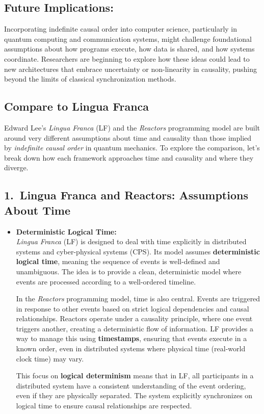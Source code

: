 \documentclass[../../../OAE-SPEC-MAIN.tex]{subfiles}
\begin{document}
\subsection*{Future Implications:}

Incorporating indefinite causal order into computer science, particularly in quantum computing and communication systems, might challenge foundational assumptions about how programs execute, how data is shared, and how systems coordinate. Researchers are beginning to explore how these ideas could lead to new architectures that embrace uncertainty or non-linearity in causality, pushing beyond the limits of classical synchronization methods.

\subsection{Compare to Lingua Franca}

Edward Lee’s \emph{Lingua Franca} (LF) and the \emph{Reactors} programming model are built around very different assumptions about time and causality than those implied by \emph{indefinite causal order} in quantum mechanics. To explore the comparison, let’s break down how each framework approaches time and causality and where they diverge.

\subsection*{1.\ Lingua Franca and Reactors: Assumptions About Time}

\begin{itemize}[leftmargin=1.5em]
\item \textbf{Deterministic Logical Time:}\\
  \emph{Lingua Franca} (LF) is designed to deal with time explicitly in distributed systems and cyber-physical systems (CPS). Its model assumes \textbf{deterministic logical time}, meaning the sequence of events is well-defined and unambiguous. The idea is to provide a clean, deterministic model where events are processed according to a well-ordered timeline.

  In the \emph{Reactors} programming model, time is also central. Events are triggered in response to other events based on strict logical dependencies and causal relationships. Reactors operate under a causality principle, where one event triggers another, creating a deterministic flow of information. LF provides a way to manage this using \textbf{timestamps}, ensuring that events execute in a known order, even in distributed systems where physical time (real-world clock time) may vary.

  This focus on \textbf{logical determinism} means that in LF, all participants in a distributed system have a consistent understanding of the event ordering, even if they are physically separated. The system explicitly synchronizes on logical time to ensure causal relationships are respected.
\end{itemize}
\end{document}
